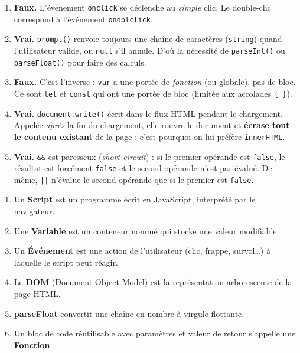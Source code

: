 \documentclass[11pt]{article}
\begin{document}
\begin{corrige}
\begin{enumerate}
    \item \textbf{Faux.} L'événement \texttt{onclick} se déclenche au \emph{simple} clic. Le double-clic correspond à l'événement \texttt{ondblclick}.
    \item \textbf{Vrai.} \texttt{prompt()} renvoie toujours une chaîne de caractères (\texttt{string}) quand l'utilisateur valide, ou \texttt{null} s'il annule. D'où la nécessité de \texttt{parseInt()} ou \texttt{parseFloat()} pour faire des calculs.
    \item \textbf{Faux.} C'est l'inverse : \texttt{var} a une portée de \emph{fonction} (ou globale), pas de bloc. Ce sont \texttt{let} et \texttt{const} qui ont une portée de bloc (limitée aux accolades \texttt{\{ \}}).
    \item \textbf{Vrai.} \texttt{document.write()} écrit dans le flux HTML pendant le chargement. Appelée \emph{après} la fin du chargement, elle rouvre le document et \textbf{écrase tout le contenu existant} de la page : c'est pourquoi on lui préfère \texttt{innerHTML}.
    \item \textbf{Vrai.} \texttt{\&\&} est paresseux (\emph{short-circuit}) : si le premier opérande est \texttt{false}, le résultat est forcément \texttt{false} et le second opérande n'est pas évalué. De même, \texttt{||} n'évalue le second opérande que si le premier est \texttt{false}.
\end{enumerate}
\end{corrige}

\begin{corrige}
\begin{enumerate}
    \item Un \textbf{Script} est un programme écrit en JavaScript, interprété par le navigateur.
    \item Une \textbf{Variable} est un conteneur nommé qui stocke une valeur modifiable.
    \item Un \textbf{Événement} est une action de l'utilisateur (clic, frappe, survol\ldots) à laquelle le script peut réagir.
    \item Le \textbf{DOM} (Document Object Model) est la représentation arborescente de la page HTML.
    \item \textbf{parseFloat} convertit une chaîne en nombre à virgule flottante.
    \item Un bloc de code réutilisable avec paramètres et valeur de retour s'appelle une \textbf{Fonction}.
\end{enumerate}
\end{corrige}
\end{document}
